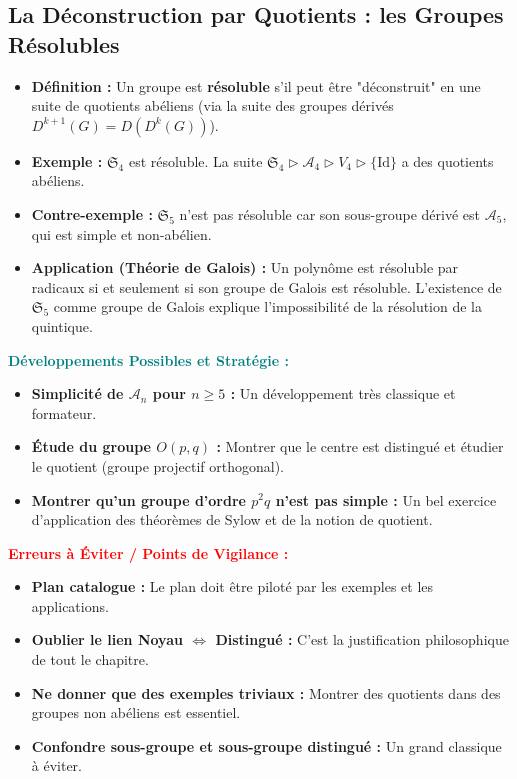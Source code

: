 \documentclass[12pt, a4paper, parskip=full]{report}
\theoremstyle{agregstyle}
\newenvironment{developpements}
  {\par\medskip\noindent\begin{oframed}\noindent\textbf{\textcolor{teal}{Développements Possibles et Stratégie :}}}
  {\end{oframed}\par\medskip}
\newenvironment{erreurs}
  {\par\medskip\noindent\begin{oframed}\noindent\textbf{\textcolor{red}{Erreurs à Éviter / Points de Vigilance :}}}
  {\end{oframed}\par\medskip}
\begin{document}
\subsection{La Déconstruction par Quotients : les Groupes Résolubles}
\begin{itemize}
    \item \textbf{Définition :} Un groupe est \textbf{résoluble} s'il peut être "déconstruit" en une suite de quotients abéliens (via la suite des groupes dérivés $D^{k+1}(G)=D(D^k(G))$).
    \item \textbf{Exemple :} $\mathfrak{S}_4$ est résoluble. La suite $\mathfrak{S}_4 \triangleright \mathcal{A}_4 \triangleright V_4 \triangleright \{\text{Id}\}$ a des quotients abéliens.
    \item \textbf{Contre-exemple :} $\mathfrak{S}_5$ n'est pas résoluble car son sous-groupe dérivé est $\mathcal{A}_5$, qui est simple et non-abélien.
    \item \textbf{Application (Théorie de Galois) :} Un polynôme est résoluble par radicaux si et seulement si son groupe de Galois est résoluble. L'existence de $\mathfrak{S}_5$ comme groupe de Galois explique l'impossibilité de la résolution de la quintique.
\end{itemize}

\begin{developpements}
    \begin{itemize}
        \item \textbf{Simplicité de $\mathcal{A}_n$ pour $n \ge 5$ :} Un développement très classique et formateur.
        \item \textbf{Étude du groupe $O(p,q)$ :} Montrer que le centre est distingué et étudier le quotient (groupe projectif orthogonal).
        \item \textbf{Montrer qu'un groupe d'ordre $p^2q$ n'est pas simple :} Un bel exercice d'application des théorèmes de Sylow et de la notion de quotient.
    \end{itemize}
\end{developpements}

\begin{erreurs}
    \begin{itemize}
        \item \textbf{Plan catalogue :} Le plan doit être piloté par les exemples et les applications.
        \item \textbf{Oublier le lien Noyau $\iff$ Distingué :} C'est la justification philosophique de tout le chapitre.
        \item \textbf{Ne donner que des exemples triviaux :} Montrer des quotients dans des groupes non abéliens est essentiel.
        \item \textbf{Confondre sous-groupe et sous-groupe distingué :} Un grand classique à éviter.
    \end{itemize}
\end{erreurs}
\end{document}
